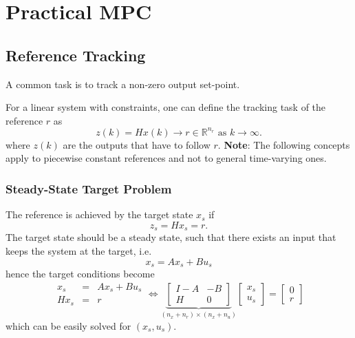 \section{Practical MPC}

\subsection{Reference Tracking}

A common task is to track a non-zero output set-point.

For a linear system with constraints, one can define the tracking task of the reference $r$ as
\begin{equation*}
    z(k) = Hx(k) \to r\in \mathbb{R}^{n_r} \text{ as } k \to \infty.
\end{equation*}
where $z(k)$ are the outputs that have to follow $r$.
\newpar{}
\textbf{Note}: The following concepts apply to piecewise constant references and not to general time-varying ones.

\subsubsection{Steady-State Target Problem}\label{steady_state_target_selection}

The reference is achieved by the target state $x_s$ if
\begin{equation*}
    z_s = Hx_s = r.
\end{equation*}
The target state should be a steady state, such that there exists an input that keeps the system at the target, i.e.
\begin{equation*}
    x_s = Ax_s +Bu_s
\end{equation*}
hence the target conditions become
\begin{equation*}
    \begin{array}{rcl}
        x_s  & = & Ax_s +Bu_s \\
        Hx_s & = & r
    \end{array}
    \Leftrightarrow
    \underbrace{\begin{bmatrix}
            I-A & -B \\
            H   & 0
        \end{bmatrix}}_{(n_x + n_r)\times(n_x + n_u)}
    \begin{bmatrix}
        x_s \\
        u_s
    \end{bmatrix}
    = \begin{bmatrix}
        0 \\
        r
    \end{bmatrix}
\end{equation*}
which can be easily solved for $(x_s, u_s)$.

